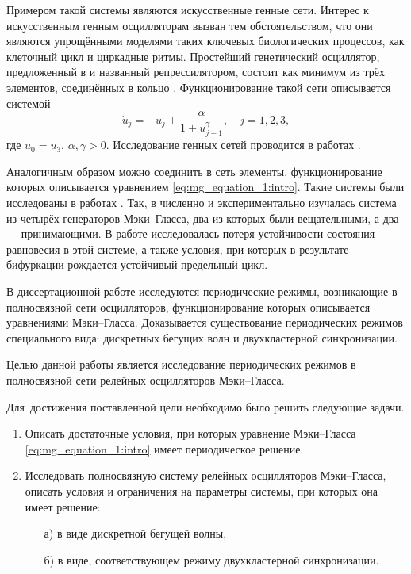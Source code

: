 Примером такой системы являются искусственные генные сети. Интерес к искусственным генным осцилляторам вызван тем обстоятельством, что они являются упрощёнными моделями таких ключевых биологических процессов, как клеточный цикл и циркадные ритмы. Простейший генетический осциллятор, предложенный в \cite{Elowitz2000} и названный репрессилятором, состоит как минимум из трёх элементов, соединённых в кольцо \cite{Glyzin2017, GlyzinBook2018}. Функционирование такой сети описывается системой
\begin{equation}
	\label{eq:intro:repressilator}
	\dot{u}_j = -u_j + \dfrac{\alpha}{1 + u^{\gamma}_{j - 1}}, \quad j = 1, 2, 3,
\end{equation}
где $u_0 = u_3$, $\alpha, \gamma > 0$. Исследование генных сетей проводится в работах \cite{Likhoshvaj2003, Volokitin2004, Golubyatnikov2006, Buse2009, Buse2010}.

Аналогичным образом можно соединить в сеть элементы, функционирование которых описывается уравнением \eqref{eq:mg_equation_1:intro}. Такие системы были исследованы в работах \cite{Preobrazhenskaia2021, Tateno2012, Sano2007, Wan2009}. Так, в \cite{Sano2007} численно и экспериментально изучалась система из четырёх генераторов Мэки--Гласса, два из которых были вещательными, а два --- принимающими. В работе \cite{Wan2009} исследовалась потеря устойчивости состояния равновесия в этой системе, а также условия, при которых в результате бифуркации рождается устойчивый предельный цикл.

В диссертационной работе исследуются периодические режимы, возникающие в полносвязной сети осцилляторов, функционирование которых описывается уравнениями Мэки--Гласса. Доказывается существование периодических режимов специального вида: дискретных бегущих волн и двухкластерной синхронизации.

\bigskip

{\aim} Целью данной работы является исследование периодических режимов в полносвязной сети релейных осцилляторов Мэки--Гласса.

Для~достижения поставленной цели необходимо было решить следующие задачи.
\begin{enumerate}[beginpenalty=10000] %
	\item Описать достаточные условия, при которых уравнение Мэки--Гласса \eqref{eq:mg_equation_1:intro} имеет периодическое решение.
	\item Исследовать полносвязную систему релейных осцилляторов Мэки--Гласса, описать условия и ограничения на параметры системы, при которых она имеет решение:
	\begin{enumerate}
		\item[а)]в виде дискретной бегущей волны,
		\item[б)]в виде, соответствующем режиму двухкластерной синхронизации.
	\end{enumerate}
\end{enumerate}

